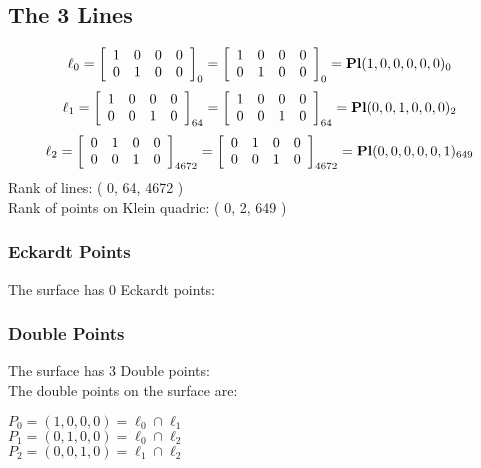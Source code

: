 \documentclass{article}
\begin{document}
{\subsection*{The 3 Lines}
$$
\ell_{0} = 
\left[
\begin{array}{*{4}{r}}
1 & 0 & 0 & 0\\
0 & 1 & 0 & 0\\
\end{array}
\right]
_{0}
=
\left[
\begin{array}{*{4}c}
1  & 0  & 0  & 0\\
0  & 1  & 0  & 0\\
\end{array}
\right]_{0}
={\rm\bf Pl}(1,0,0,0,0,0 )_{0}$$
$$
\ell_{1} = 
\left[
\begin{array}{*{4}{r}}
1 & 0 & 0 & 0\\
0 & 0 & 1 & 0\\
\end{array}
\right]
_{64}
=
\left[
\begin{array}{*{4}c}
1  & 0  & 0  & 0\\
0  & 0  & 1  & 0\\
\end{array}
\right]_{64}
={\rm\bf Pl}(0,0,1,0,0,0 )_{2}$$
$$
\ell_{2} = 
\left[
\begin{array}{*{4}{r}}
0 & 1 & 0 & 0\\
0 & 0 & 1 & 0\\
\end{array}
\right]
_{4672}
=
\left[
\begin{array}{*{4}c}
0  & 1  & 0  & 0\\
0  & 0  & 1  & 0\\
\end{array}
\right]_{4672}
={\rm\bf Pl}(0,0,0,0,0,1 )_{649}$$
Rank of lines: ( 0, 64, 4672 )\\
Rank of points on Klein quadric: ( 0, 2, 649 )\\
\subsubsection*{Eckardt Points}
The surface has 0 Eckardt points:\\
\subsubsection*{Double Points}
The surface has 3 Double points:\\
The double points on the surface are:\\
\begin{multicols}{2}
\noindent
$P_{0} = ( 1, 0, 0, 0 ) = \ell_{0} \cap \ell_{1} $\\
$P_{1} = ( 0, 1, 0, 0 ) = \ell_{0} \cap \ell_{2} $\\
$P_{2} = ( 0, 0, 1, 0 ) = \ell_{1} \cap \ell_{2} $\\
\end{multicols}
}
\end{document}
